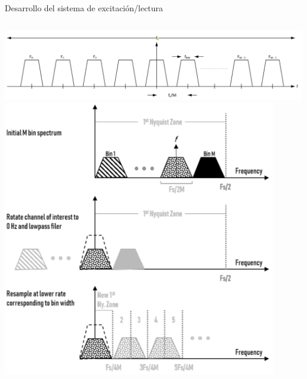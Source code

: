 \documentclass[ignorenonframetext,12pt]{beamer}
\begin{document}
\begin{frame}{Desarrollo del sistema de excitación/lectura}
\begin{columns}
\begin{column}{0.6\textwidth}
												\begin{center}
																\includegraphics[width=\textwidth]{FDM_channel_diagram}
																\includegraphics[width=0.9\textwidth]{pfb_basic1}
												\end{center}
								\end{column}
				\end{columns}
\end{frame}
\end{document}
